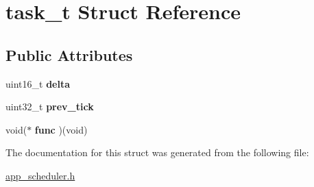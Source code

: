 \hypertarget{structtask__t}{}\section{task\+\_\+t Struct Reference}
\label{structtask__t}
\subsection*{Public Attributes}
\begin{DoxyCompactItemize}
\item 
\mbox{\label{structtask__t_afb639c6af260e6e4238afb91b18fc810}} 
uint16\+\_\+t {\bfseries delta}
\item 
\mbox{\label{structtask__t_abe80b8f8e982e4e938fcc34eaee67fb3}} 
uint32\+\_\+t {\bfseries prev\+\_\+tick}
\item 
\mbox{\label{structtask__t_a04b28fdc153e1fd9a8f79283e4009391}} 
void($\ast$ {\bfseries func} )(void)
\end{DoxyCompactItemize}


The documentation for this struct was generated from the following file\+:\begin{DoxyCompactItemize}
\item 
\mbox{\hyperlink{app__scheduler_8h}{app\+\_\+scheduler.\+h}}\end{DoxyCompactItemize}
